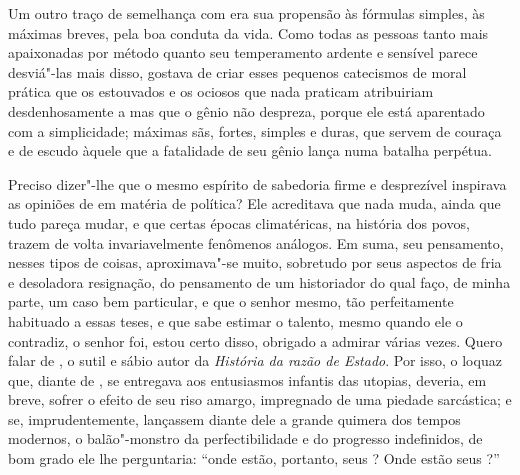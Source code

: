 Um outro traço de semelhança com  era sua propensão às fórmulas
simples, às máximas breves, pela boa conduta da vida. Como todas as
pessoas tanto mais apaixonadas por método quanto seu temperamento
ardente e sensível parece desviá"-las mais disso,  gostava de
criar esses pequenos catecismos de moral prática que os estouvados e os
ociosos que nada praticam atribuiriam desdenhosamente a 
mas que o gênio não despreza, porque ele está aparentado com a
simplicidade; máximas sãs, fortes, simples e duras, que servem de
couraça e de escudo àquele que a fatalidade de seu gênio lança numa
batalha perpétua.

Preciso dizer"-lhe que o mesmo espírito de sabedoria firme e desprezível
inspirava as opiniões de  em matéria de política? Ele
acreditava que nada muda, ainda que tudo pareça mudar, e que certas
épocas climatéricas, na história dos povos, trazem de volta
invariavelmente fenômenos análogos. Em suma, seu pensamento, nesses
tipos de coisas, aproximava"-se muito, sobretudo por seus aspectos de
fria e desoladora resignação, do pensamento de um historiador do qual
faço, de minha parte, um caso bem particular, e que o senhor mesmo, tão
perfeitamente habituado a essas teses, e que sabe estimar o talento,
mesmo quando ele o contradiz, o senhor foi, estou certo disso, obrigado
a admirar várias vezes. Quero falar de , o sutil e sábio autor
da \textit{História da razão de Estado}. Por isso, o loquaz que, diante
de , se entregava aos entusiasmos infantis das utopias,
deveria, em breve, sofrer o efeito de seu riso amargo, impregnado de
uma piedade sarcástica; e se, imprudentemente, lançassem diante dele a
grande quimera dos tempos modernos, o balão"-monstro da perfectibilidade
e do progresso indefinidos, de bom grado ele lhe perguntaria: “onde
estão, portanto, seus ? Onde estão seus ?”

